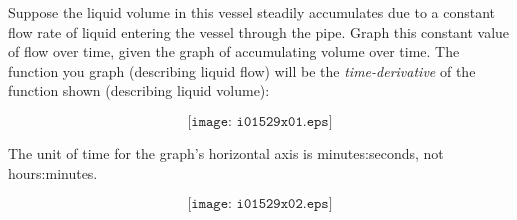 

Suppose the liquid volume in this vessel steadily accumulates due to a constant flow rate of liquid entering the vessel through the pipe.  Graph this constant value of flow over time, given the graph of accumulating volume over time.  The function you graph (describing liquid flow) will be the {\it time-derivative} of the function shown (describing liquid volume):

$$\texttt{[image: i01529x01.eps]}$$

The unit of time for the graph's horizontal axis is minutes:seconds, not hours:minutes.







$$\texttt{[image: i01529x02.eps]}$$












